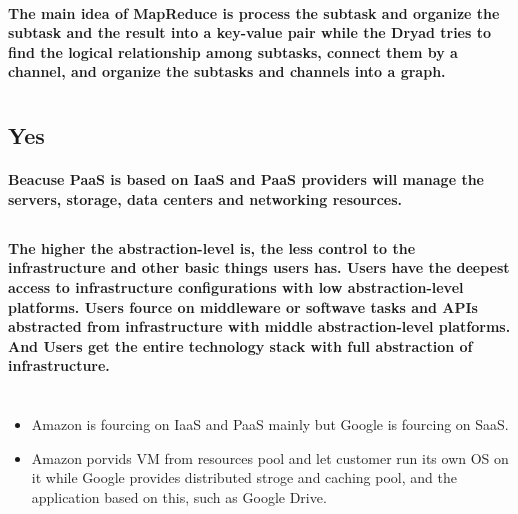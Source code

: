 \documentclass{article}
\begin{document}
            \paragraph{
                The main idea of MapReduce is process the subtask and organize the subtask and the result into a key-value pair while the Dryad tries to find the logical relationship among subtasks, connect them by a channel, and organize the subtasks and channels into a graph.
            }
    \section{}
        \subsection{Yes}
            \paragraph{
                Beacuse PaaS is based on IaaS and PaaS providers will manage the servers, storage, data centers and networking resources.
            }
        \subsection{}
            \paragraph{
                The higher the abstraction-level is, the less control to the infrastructure and other basic things users has. Users have the deepest access to infrastructure configurations with low abstraction-level platforms. Users fource on middleware or softwave tasks and APIs abstracted from infrastructure with middle abstraction-level platforms. And Users get the entire technology stack with full abstraction of infrastructure.
            }
    \section{}
        \subsection{}
            \begin{itemize}
                \item Amazon is fourcing on IaaS and PaaS mainly but Google is fourcing on SaaS.
                \item Amazon porvids VM from resources pool and let customer run its own OS on it while Google provides distributed stroge and caching pool, and the application based on this, such as Google Drive.
            \end{itemize}
\end{document}
